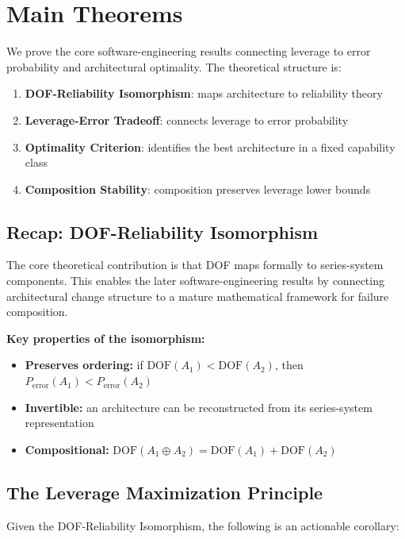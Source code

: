 \section{Main Theorems}\label{main-theorems}

We prove the core software-engineering results connecting leverage to error probability and architectural optimality. The theoretical structure is:

\begin{enumerate}
\item \textbf{DOF-Reliability Isomorphism}: maps architecture to reliability theory
\item \textbf{Leverage-Error Tradeoff}: connects leverage to error probability
\item \textbf{Optimality Criterion}: identifies the best architecture in a fixed capability class
\item \textbf{Composition Stability}: composition preserves leverage lower bounds
\end{enumerate}

\subsection{Recap: DOF-Reliability Isomorphism}

The core theoretical contribution is that DOF maps formally to series-system components. This enables the later software-engineering results by connecting architectural change structure to a mature mathematical framework for failure composition.

\textbf{Key properties of the isomorphism:}
\begin{itemize}
\item \textbf{Preserves ordering:} if $\mathrm{DOF}(A_1) < \mathrm{DOF}(A_2)$, then $P_{\mathrm{error}}(A_1) < P_{\mathrm{error}}(A_2)$
\item \textbf{Invertible:} an architecture can be reconstructed from its series-system representation
\item \textbf{Compositional:} $\mathrm{DOF}(A_1 \oplus A_2) = \mathrm{DOF}(A_1) + \mathrm{DOF}(A_2)$
\end{itemize}

\subsection{The Leverage Maximization Principle}

Given the DOF-Reliability Isomorphism, the following is an actionable corollary:

